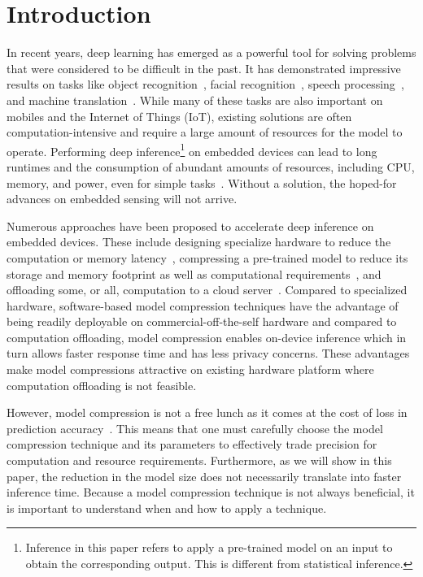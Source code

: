 \section{Introduction}
In recent years, deep learning has emerged as a powerful tool for solving problems that were considered to be difficult in the past. It has
demonstrated impressive results on tasks like object recognition~\cite{donahue14,he2016deep}, facial
recognition~\cite{parkhi2015deep,sun2014deep}, speech processing~\cite{pmlrv48amodei16}, and machine translation~\cite{bahdanau2014neural}.
While many of these tasks are also important on mobiles and the Internet of Things (IoT), existing solutions are often
computation-intensive and require a large amount of resources for the model to operate. Performing deep inference\footnote{Inference in
this paper refers to apply a pre-trained model on an input to obtain the corresponding output. This is different from statistical
inference.} on embedded devices can lead to long runtimes and the consumption of abundant amounts of resources, including CPU, memory, and
power, even for simple tasks~\cite{CanzianiPC16}. Without a solution,
 the hoped-for advances on embedded sensing will not arrive.


Numerous approaches have been proposed to accelerate deep inference on embedded devices. These include designing specialize hardware to
reduce the computation or memory latency~\cite{}, compressing a pre-trained model to reduce its storage and memory footprint as well as
computational requirements~\cite{}, and offloading some, or all, computation to a cloud
server~\cite{Kang2017neurosurgeon,teerapittayanon2017distributed}. Compared to specialized hardware, software-based model compression
techniques have the advantage of being readily deployable on commercial-off-the-self hardware and compared to computation offloading, model
compression enables on-device inference which in turn allows faster response time and has less privacy concerns. These advantages make
model compressions attractive on existing hardware platform where computation offloading is not feasible.


However, model compression is not a free lunch as it comes at the cost of loss in prediction accuracy~\cite{}. This means that one must
carefully choose the model compression technique and its parameters to effectively trade precision for computation and resource
requirements. Furthermore, as we will show in this paper, the reduction in the model size does not necessarily translate into faster
inference time. Because a model compression technique is not always beneficial, it is important to understand when and how to apply a
 technique.

